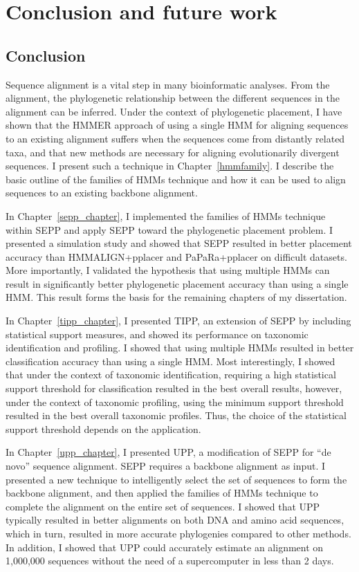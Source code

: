 \chapter{Conclusion and future work}\label{conclusion}
%

\section{Conclusion}
Sequence alignment is a vital step in many bioinformatic analyses.  From the alignment, the phylogenetic relationship between the different sequences in the alignment can be inferred.  Under the context of phylogenetic placement, I have shown that the HMMER approach of using a single HMM for aligning sequences to an existing alignment suffers when the sequences come from distantly related taxa, and that new methods are necessary for aligning evolutionarily divergent sequences.  I present such a technique in Chapter~\ref{hmmfamily}.  I describe the basic outline of the families of HMMs technique and how it can be used to align sequences to an existing backbone alignment.  

In Chapter~\ref{sepp_chapter}, I implemented the families of HMMs technique within SEPP and apply SEPP toward the phylogenetic placement problem.  I presented a simulation study and showed that SEPP resulted in better placement accuracy than HMMALIGN+pplacer and PaPaRa+pplacer on difficult datasets.  More importantly, I validated the hypothesis that using multiple HMMs can result in significantly better phylogenetic placement accuracy than using a single HMM.  This result forms the basis for the remaining chapters of my dissertation.

In Chapter~\ref{tipp_chapter}, I presented TIPP, an extension of SEPP by including statistical support measures, and showed its performance on  taxonomic identification and profiling.  I showed that using multiple HMMs resulted in better classification accuracy than using a single HMM.  Most interestingly, I showed that under the context of taxonomic identification, requiring a high statistical support threshold for classification resulted in the best overall results, however, under the context of taxonomic profiling, using the minimum support threshold resulted in the best overall taxonomic profiles.  Thus, the choice of the statistical support threshold depends on the application.

In Chapter~\ref{upp_chapter}, I presented UPP, a modification of SEPP for ``de novo'' sequence alignment.  SEPP requires a backbone alignment as input.  I presented a new technique to intelligently select the set of sequences to form the backbone alignment, and then applied the families of HMMs technique to complete the alignment on the entire set of sequences.  I showed that UPP typically resulted in better alignments on both DNA and amino acid sequences, which in turn, resulted in more accurate phylogenies compared to other methods.  In addition, I showed that UPP could accurately estimate an alignment on 1,000,000 sequences without the need of a supercomputer in less than 2 days.

